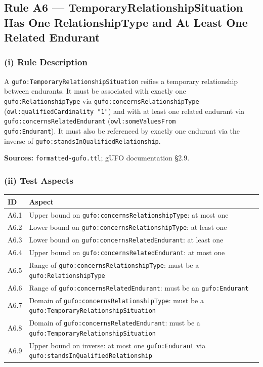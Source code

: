 \documentclass[12pt,a4paper]{article}
\newcommand{\gufoclass}[1]{\nolinkurl{gufo:#1}}
\newcommand{\gufoprop}[1]{\nolinkurl{gufo:#1}}
\begin{document}
\subsection{Rule A6 --- TemporaryRelationshipSituation Has One RelationshipType and At Least One Related Endurant}
\label{sec:rule-a6}

\subsubsection*{(i) Rule Description}

A \gufoclass{TemporaryRelationshipSituation} reifies a temporary relationship
between endurants. It must be associated with exactly one
\gufoclass{RelationshipType} via \gufoprop{concernsRelationshipType}
(\nolinkurl{owl:qualifiedCardinality "1"}) and with at least one related endurant
via \gufoprop{concernsRelatedEndurant} (\nolinkurl{owl:someValuesFrom
gufo:Endurant}). It must also be referenced by exactly one endurant via the
inverse of \gufoprop{standsInQualifiedRelationship}.

\textbf{Sources:} \texttt{formatted-gufo.ttl}; gUFO documentation \S2.9.

\subsubsection*{(ii) Test Aspects}

\begin{tabular}{lL{9cm}}
  \toprule
  \textbf{ID} & \textbf{Aspect} \\
  \midrule
  A6.1 & Upper bound on \gufoprop{concernsRelationshipType}: at most one \\
  A6.2 & Lower bound on \gufoprop{concernsRelationshipType}: at least one \\
  A6.3 & Lower bound on \gufoprop{concernsRelatedEndurant}: at least one \\
  A6.4 & Upper bound on \gufoprop{concernsRelatedEndurant}: at most one \\
  A6.5 & Range of \gufoprop{concernsRelationshipType}: must be a \gufoclass{RelationshipType} \\
  A6.6 & Range of \gufoprop{concernsRelatedEndurant}: must be an \gufoclass{Endurant} \\
  A6.7 & Domain of \gufoprop{concernsRelationshipType}: must be a
         \gufoclass{TemporaryRelationshipSituation} \\
  A6.8 & Domain of \gufoprop{concernsRelatedEndurant}: must be a
         \gufoclass{TemporaryRelationshipSituation} \\
  A6.9 & Upper bound on inverse: at most one \gufoclass{Endurant} via
         \gufoprop{standsInQualifiedRelationship} \\
  \bottomrule
\end{tabular}
\end{document}
